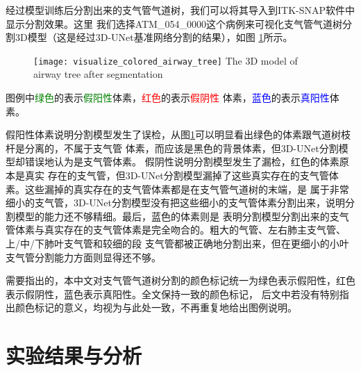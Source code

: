 经过模型训练后分割出来的支气管气道树，我们可以将其导入到ITK-SNAP\cite{Yushkevich2006ITKSNAP}软件中显示分割效果。这里
我们选择ATM\_054\_0000这个病例来可视化支气管气道树分割3D模型（这是经过3D-UNet基准网络分割的结果），如图
\ref{fig:airway_tree_model}所示。
\begin{figure}[!htp]
    \centering
    \texttt{[image: visualize\_colored\_airway\_tree]}
        {The 3D model of airway tree after segmentation}
    \label{fig:airway_tree_model}
\end{figure}
图例中\textcolor{green}{绿色}的表示\textcolor{green}{假阳性}体素，\textcolor{red}{红色}的表示\textcolor{red}{假阴性}
体素，\textcolor{blue}{蓝色}的表示\textcolor{blue}{真阳性}体素。

假阳性体素说明分割模型发生了误检，从图\ref{fig:airway_tree_model}可以明显看出绿色的体素跟气道树枝杆是分离的，不属于支气管
体素，而应该是黑色的背景体素，但3D-UNet分割模型却错误地认为是支气管体素。 假阴性说明分割模型发生了漏检，红色的体素原本是真实
存在的支气管，但3D-UNet分割模型漏掉了这些真实存在的支气管体素。这些漏掉的真实存在的支气管体素都是在支气管气道树的末端，是
属于非常细小的支气管，3D-UNet分割模型没有把这些细小的支气管体素分割出来，说明分割模型的能力还不够精细。最后，蓝色的体素则是
表明分割模型分割出来的支气管体素与真实存在的支气管体素是完全吻合的。粗大的气管、左右肺主支气管、上/中/下肺叶支气管和较细的段
支气管都被正确地分割出来，但在更细小的小叶支气管分割能力方面则显得还不够。

需要指出的，本中文对支气管气道树分割的颜色标记统一为绿色表示假阳性，红色表示假阴性，蓝色表示真阳性。全文保持一致的颜色标记，
后文中若没有特别指出颜色标记的意义，均视为与此处一致，不再重复地给出图例说明。

\section{实验结果与分析}
